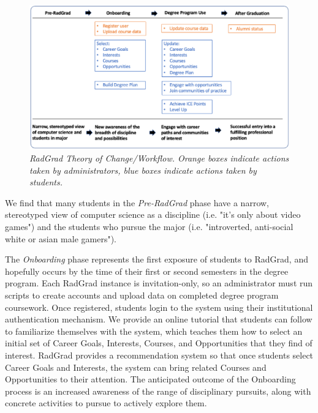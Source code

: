 \documentclass[acmsmall]{acmart}
\begin{document}
\begin{figure}[ht]
\centering
\includegraphics[width=\linewidth]{images/radgrad-workflow.eps}
\caption{\em RadGrad Theory of Change/Workflow. Orange boxes indicate actions taken by administrators, blue boxes indicate actions taken by students.}
\label{fig:theory-of-change}
\end{figure}

We find that many students in the {\em Pre-RadGrad} phase have a narrow, stereotyped view of computer science as a discipline (i.e. "it's only about video games") and the students who pursue the major (i.e. "introverted, anti-social white or asian male gamers").

The {\em Onboarding} phase represents the first exposure of students to RadGrad, and hopefully occurs by the time of their first or second semesters in the degree program. Each RadGrad instance is invitation-only, so an administrator must run scripts to create accounts and upload data on completed degree program coursework. Once registered, students login to the system using their institutional authentication mechanism. We provide an online tutorial that students can follow to familiarize themselves with the system, which teaches them how to select an initial set of Career Goals, Interests, Courses, and Opportunities that they find of interest. RadGrad provides a recommendation system so that once students select Career Goals and Interests, the system can bring related Courses and Opportunities to their attention.  The anticipated outcome of the Onboarding process is an increased awareness of the range of disciplinary pursuits, along with concrete activities to pursue to actively explore them.
\end{document}
